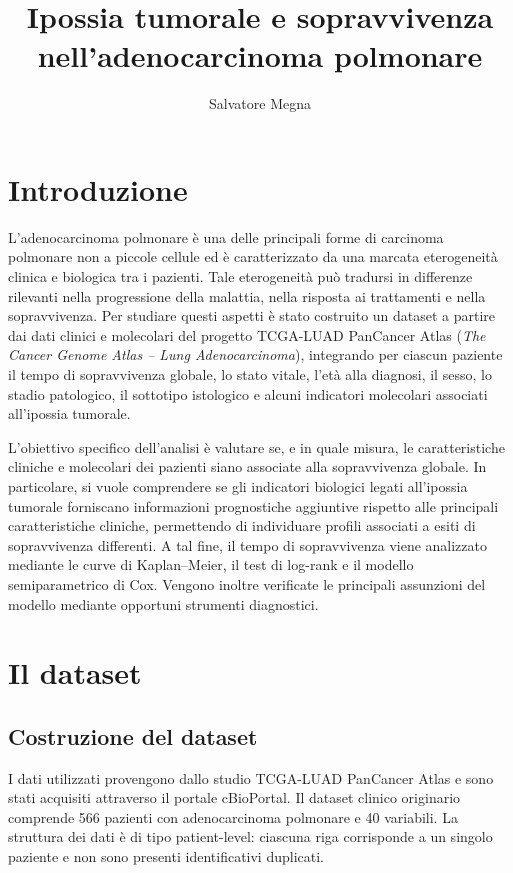 \documentclass[12pt,a4paper]{article}
\title{Ipossia tumorale e sopravvivenza nell'adenocarcinoma polmonare}
\author{Salvatore Megna}
\date{}
\begin{document}
\maketitle

\section{Introduzione}

L'adenocarcinoma polmonare è una delle principali forme di carcinoma polmonare non a piccole cellule ed è caratterizzato da una marcata eterogeneità clinica e biologica tra i pazienti. Tale eterogeneità può tradursi in differenze rilevanti nella progressione della malattia, nella risposta ai trattamenti e nella sopravvivenza. Per studiare questi aspetti è stato costruito un dataset a partire dai dati clinici e molecolari del progetto TCGA-LUAD PanCancer Atlas (\textit{The Cancer Genome Atlas -- Lung Adenocarcinoma}), integrando per ciascun paziente il tempo di sopravvivenza globale, lo stato vitale, l'età alla diagnosi, il sesso, lo stadio patologico, il sottotipo istologico e alcuni indicatori molecolari associati all'ipossia tumorale.

L'obiettivo specifico dell'analisi è valutare se, e in quale misura, le caratteristiche cliniche e molecolari dei pazienti siano associate alla sopravvivenza globale. In particolare, si vuole comprendere se gli indicatori biologici legati all'ipossia tumorale forniscano informazioni prognostiche aggiuntive rispetto alle principali caratteristiche cliniche, permettendo di individuare profili associati a esiti di sopravvivenza differenti. A tal fine, il tempo di sopravvivenza viene analizzato mediante le curve di Kaplan--Meier, il test di log-rank e il modello semiparametrico di Cox. Vengono inoltre verificate le principali assunzioni del modello mediante opportuni strumenti diagnostici.

\section{Il dataset}

\subsection{Costruzione del dataset}

I dati utilizzati provengono dallo studio TCGA-LUAD PanCancer Atlas e sono stati acquisiti attraverso il portale cBioPortal. Il dataset clinico originario comprende 566 pazienti con adenocarcinoma polmonare e 40 variabili. La struttura dei dati è di tipo patient-level: ciascuna riga corrisponde a un singolo paziente e non sono presenti identificativi duplicati.
\end{document}
